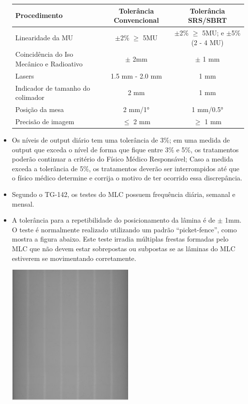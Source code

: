 \documentclass[11pt,a4paper]{article}
\newcounter{exemplo}
\begin{document}
\begin{exemplo}[11. Qualidade ]
\begin{itemize}
        \begin{center}
            \begin{tabular}[h]{lcc}
                \toprule
                Procedimento & Tolerância Convencional & Tolerância SRS/SBRT \\
                \midrule
                Linearidade da MU & $\pm$2\% $\geq$ 5MU & $\pm$2\% $\geq$ 5MU; e $\pm$5\% (2 - 4 MU)\\
                Coincidência do Iso Mecânico e Radioativo & $\pm$ 2mm & $\pm$ 1 mm \\
                Lasers & 1.5 mm - 2.0 mm & 1 mm \\
                Indicador de tamanho do colimador & 2 mm & 1 mm \\
                Posição da mesa & 2 mm/\ang{1} & 1 mm/\ang{0.5} \\
                Precisão de imagem & $\leq$ 2 mm & $\geq$ 1 mm \\
                \bottomrule
                \bottomrule
            \end{tabular}
        \end{center}

        \item Os níveis de output diário tem uma tolerância de 3\%; em uma medida de output que exceda o nível de forma que fique entre 3\% e 5\%, os tratamentos poderão continuar a critério do Físico Médico Responsável; Caso a medida exceda a tolerância de 5\%, os tratamentos deverão ser interrompidos até que o físico médico determine e corrija o motivo de ter ocorrido essa discrepância.
        
        \item Segundo o TG-142, os testes do MLC possuem frequência diária, semanal e mensal.
        
        \item A tolerância para a repetibilidade do posicionamento da lâmina é de $\pm$ 1mm. O teste é normalmente realizado utilizando um padrão ``picket-fence'', como mostra a figura abaixo. Este teste irradia múltiplas frestas formadas pelo MLC que não devem estar sobrepostas ou subpostas se as lâminas do MLC estiverem se movimentando corretamente.
        
        \begin{center}
            \includegraphics[width=0.5\textwidth]{Imagens/picketfence.jpg}
        \end{center}


\end{itemize}
\end{exemplo}
\end{document}
